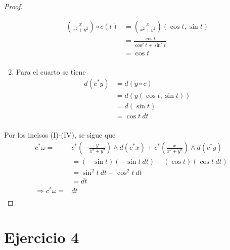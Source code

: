 \documentclass[12pt]{report}
\theoremstyle{largebreak}
\begin{document}
\begin{proof}
\begin{enumerate}
\begin{equation*}
\begin{split}
                    \left(\frac{x}{x^2+y^2}\right)\circ c(t)&=\left(\frac{x}{x^2+y^2}\right)(\cos t,\sin t)\\
                    &=\frac{\cos t}{\cos^2t+\sin^2t}\\
                    &=\cos t\\
                \end{split}
            \end{equation*}
            \item Para el cuarto se tiene
            \begin{equation*}
                \begin{split}
                    d\left(c^*y\right)&=d\left(y\circ c\right)\\
                    &=d\left(y(\cos t, \sin t)\right)\\
                    &=d\left(\sin t\right)\\
                    &=\cos t\:dt\\
                \end{split}
            \end{equation*}
        \end{enumerate}
        Por los incisos (I)-(IV), se sigue que
        \begin{equation*}
            \begin{split}
                c^*\omega=&c^*\left(-\frac{y}{x^2+y^2}\right)\wedge d\left(c^*x\right)+c^*\left(\frac{x}{x^2+y^2}\right)\wedge d\left(c^*y\right) \\
                &=(-\sin t)(-\sin t\:dt)+(\cos t)(\cos t\:dt)\\
                &=\sin^2t\:dt+\cos^2t\:dt\\
                &=dt\\
                \Rightarrow c^*\omega=&dt\\
            \end{split}
        \end{equation*}
    \end{proof}

    \newpage

    \renewcommand{\theenumi}{\alph{enumi}}
    \renewcommand{\labelenumi}{{(\theenumi)}}

    \section{Ejercicio 4}
\end{document}
